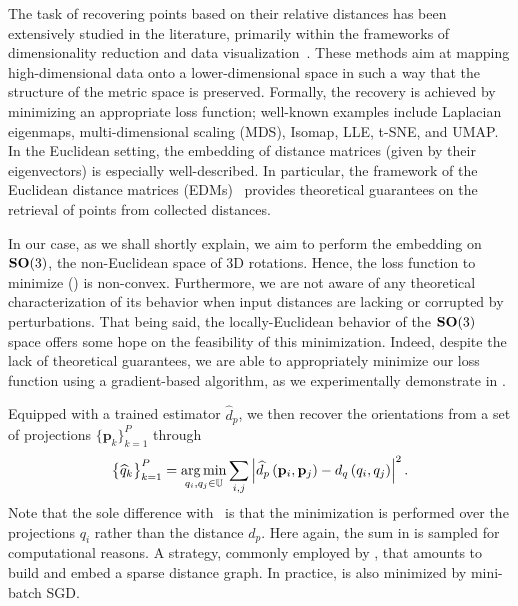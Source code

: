 The task of recovering points based on their relative distances has been extensively studied in the literature, primarily within the frameworks of dimensionality reduction and data visualization~\cite{belkin2003laplacian,kruskal1978multidimensional, maaten2008visualizing, mcinnes2018umap,dokmanic2015euclidean}.
These methods aim at mapping high-dimensional data onto a lower-dimensional space in such a way that the structure of the metric space is preserved.
Formally, the recovery is achieved by minimizing an appropriate loss function; well-known examples include Laplacian eigenmaps, multi-dimensional scaling (MDS), Isomap, LLE, t-SNE, and UMAP.
In the Euclidean setting, the embedding of distance matrices (given by their eigenvectors) is especially well-described.
In particular, the framework of the Euclidean distance matrices (EDMs)~\cite{dokmanic2015euclidean} provides theoretical guarantees on the retrieval of points from collected distances.

In our case, as we shall shortly explain, we aim to perform the embedding on $\mathrm{\mathbf{SO}}(3)$, the non-Euclidean space of 3D rotations. Hence, the loss function to minimize () is non-convex. Furthermore, we are not aware of any theoretical characterization of its behavior when input distances are lacking or corrupted by perturbations. That being said, the locally-Euclidean behavior of the $\mathrm{\mathbf{SO}}(3)$ space offers some hope on the feasibility of this minimization.
Indeed, despite the lack of theoretical guarantees, we are able to appropriately minimize our loss function using a gradient-based algorithm, as we experimentally demonstrate in .

Equipped with a trained estimator $\widehat{d}_p$, we then recover the orientations from a set of projections $\big\{ \mathbf{p}_k \big\}_{k=1}^P$ through
\begin{equation}
    \big\{ \widehat{q}_k \big\}_{k=1}^P = \operatorname*{arg\,min}_{q_i, q_j \in \mathbb{U}} \sum_{i,j} \left| \widehat{d}_p \left( \mathbf{p}_i, \mathbf{p}_j \right) - d_q\left(q_i,q_j\right) \right|^2.
    \label{eqn:orientation-recovery}
\end{equation}
Note that the sole difference with~ is that the minimization is performed over the projections $q_i$ rather than the distance $d_p$. Here again, the sum in  is sampled for computational reasons.
A strategy, commonly employed by , that amounts to build and embed a sparse distance graph. 
In practice,  is also minimized by mini-batch SGD.
